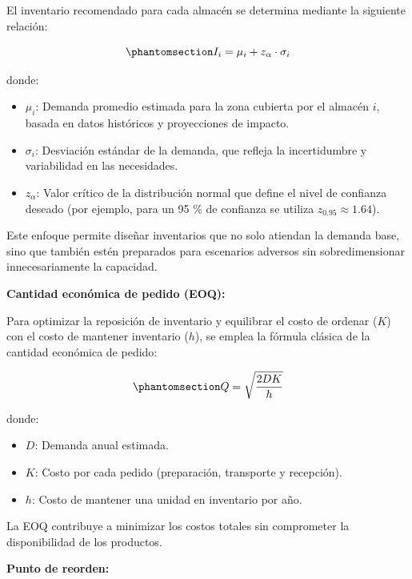 \documentclass[
  spanish,
  us-letterpaper,
]{scrreprt}
\providecommand{\tightlist}{%
  \setlength{\itemsep}{0pt}\setlength{\parskip}{0pt}}
\numberwithin{equation}{chapter} %
\begin{document}
El inventario recomendado para cada almacén se determina mediante la
siguiente relación:

\begin{equation}\phantomsection\label{eq-PBHE_completa}{
I_i = \mu_i + z_{\alpha} \cdot \sigma_i 
}\end{equation}

donde:

\begin{itemize}
\tightlist
\item
  \(\mu_i\): Demanda promedio estimada para la zona cubierta por el
  almacén \(i\), basada en datos históricos y proyecciones de impacto.
\item
  \(\sigma_i\): Desviación estándar de la demanda, que refleja la
  incertidumbre y variabilidad en las necesidades.
\item
  \(z_{\alpha}\): Valor crítico de la distribución normal que define el
  nivel de confianza deseado (por ejemplo, para un 95 \% de confianza se
  utiliza \(z_{0.95} \approx 1.64\)).
\end{itemize}

Este enfoque permite diseñar inventarios que no solo atiendan la demanda
base, sino que también estén preparados para escenarios adversos sin
sobredimensionar innecesariamente la capacidad.

\textbf{Cantidad económica de pedido (EOQ):}

Para optimizar la reposición de inventario y equilibrar el costo de
ordenar (\(K\)) con el costo de mantener inventario (\(h\)), se emplea
la fórmula clásica de la cantidad económica de pedido:

\begin{equation}\phantomsection\label{eq-PBHE_completa}{
Q = \sqrt{\frac{2DK}{h}} 
}\end{equation}

donde:

\begin{itemize}
\tightlist
\item
  \(D\): Demanda anual estimada.
\item
  \(K\): Costo por cada pedido (preparación, transporte y recepción).
\item
  \(h\): Costo de mantener una unidad en inventario por año.
\end{itemize}

La EOQ contribuye a minimizar los costos totales sin comprometer la
disponibilidad de los productos.

\textbf{Punto de reorden:}
\end{document}

